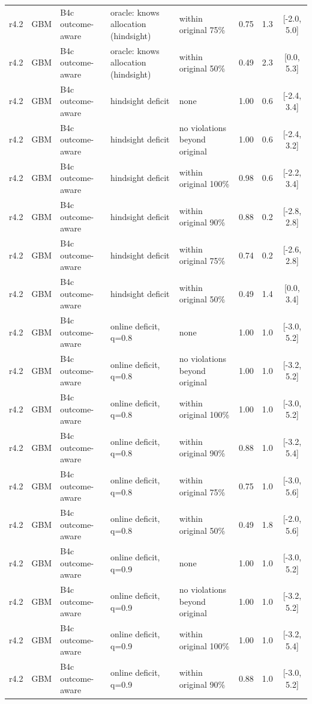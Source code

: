 \documentclass[10pt,onecolumn,letterpaper]{article}
\begin{document}
\begin{longtable}{lllp{4.2cm}p{3.4cm}ccc}
r4.2 & GBM & B4c outcome-aware & oracle: knows allocation (hindsight) & within original 75\% & 0.75 & 1.3 & [-2.0, 5.0] \\
r4.2 & GBM & B4c outcome-aware & oracle: knows allocation (hindsight) & within original 50\% & 0.49 & 2.3 & [0.0, 5.3] \\
r4.2 & GBM & B4c outcome-aware & hindsight deficit & none & 1.00 & 0.6 & [-2.4, 3.4] \\
r4.2 & GBM & B4c outcome-aware & hindsight deficit & no violations beyond original & 1.00 & 0.6 & [-2.4, 3.2] \\
r4.2 & GBM & B4c outcome-aware & hindsight deficit & within original 100\% & 0.98 & 0.6 & [-2.2, 3.4] \\
r4.2 & GBM & B4c outcome-aware & hindsight deficit & within original 90\% & 0.88 & 0.2 & [-2.8, 2.8] \\
r4.2 & GBM & B4c outcome-aware & hindsight deficit & within original 75\% & 0.74 & 0.2 & [-2.6, 2.8] \\
r4.2 & GBM & B4c outcome-aware & hindsight deficit & within original 50\% & 0.49 & 1.4 & [0.0, 3.4] \\
r4.2 & GBM & B4c outcome-aware & online deficit, q=0.8 & none & 1.00 & 1.0 & [-3.0, 5.2] \\
r4.2 & GBM & B4c outcome-aware & online deficit, q=0.8 & no violations beyond original & 1.00 & 1.0 & [-3.2, 5.2] \\
r4.2 & GBM & B4c outcome-aware & online deficit, q=0.8 & within original 100\% & 1.00 & 1.0 & [-3.0, 5.2] \\
r4.2 & GBM & B4c outcome-aware & online deficit, q=0.8 & within original 90\% & 0.88 & 1.0 & [-3.2, 5.4] \\
r4.2 & GBM & B4c outcome-aware & online deficit, q=0.8 & within original 75\% & 0.75 & 1.0 & [-3.0, 5.6] \\
r4.2 & GBM & B4c outcome-aware & online deficit, q=0.8 & within original 50\% & 0.49 & 1.8 & [-2.0, 5.6] \\
r4.2 & GBM & B4c outcome-aware & online deficit, q=0.9 & none & 1.00 & 1.0 & [-3.0, 5.2] \\
r4.2 & GBM & B4c outcome-aware & online deficit, q=0.9 & no violations beyond original & 1.00 & 1.0 & [-3.2, 5.2] \\
r4.2 & GBM & B4c outcome-aware & online deficit, q=0.9 & within original 100\% & 1.00 & 1.0 & [-3.2, 5.4] \\
r4.2 & GBM & B4c outcome-aware & online deficit, q=0.9 & within original 90\% & 0.88 & 1.0 & [-3.0, 5.2] \\

\end{longtable}
\end{document}
